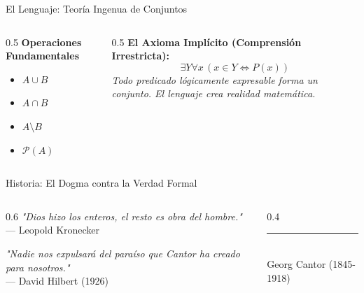 \documentclass[10pt, aspectratio=169]{beamer}
\begin{document}
\begin{frame}{El Lenguaje: Teoría Ingenua de Conjuntos}
    \begin{columns}
        \begin{column}{0.5\textwidth}
            \textbf{Operaciones Fundamentales}
            \vspace{0.3cm}
            \begin{itemize}
                \large
                \item $A \cup B$
                \item $A \cap B$
                \item $A \setminus B$
                \item $\mathcal{P}(A)$
            \end{itemize}
        \end{column}
        \begin{column}{0.5\textwidth}
            \textbf{El Axioma Implícito (Comprensión Irrestricta):}
            \vspace{0.3cm}
            \begin{equation*}
                \exists Y \forall x \, (x \in Y \iff P(x))
            \end{equation*}
            \vspace{0.5cm}
            \footnotesize \textit{Todo predicado lógicamente expresable forma un conjunto. El lenguaje crea realidad matemática.}
        \end{column}
    \end{columns}
\end{frame}
\begin{frame}{Historia: El Dogma contra la Verdad Formal}
    \begin{columns}
        \begin{column}{0.6\textwidth}
            \textit{"Dios hizo los enteros, el resto es obra del hombre."} 
            \\ \vspace{0.2cm} \hfill --- Leopold Kronecker
            
            \vspace{1cm}
            \textit{"Nadie nos expulsará del paraíso que Cantor ha creado para nosotros."} 
            \\ \vspace{0.2cm} \hfill --- David Hilbert (1926)
        \end{column}
        \begin{column}{0.4\textwidth}
            \centering
            \rule{0.7\textwidth}{4cm} %
            \\ \vspace{0.2cm} \small Georg Cantor (1845-1918)
        \end{column}
    \end{columns}
\end{frame}
\end{document}
